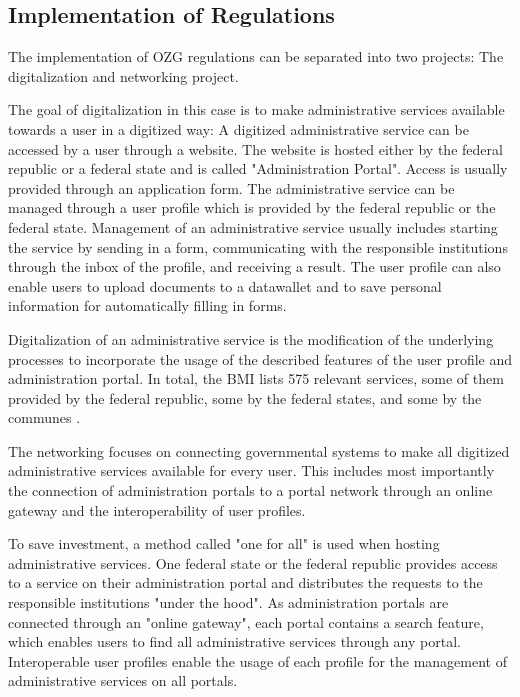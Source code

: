\subsection{Implementation of Regulations}

The implementation of OZG regulations can be separated into two projects: The digitalization and networking project.

The goal of digitalization in this case is to make administrative services available towards a user in a digitized way: A digitized administrative service can be accessed by a user through a website. The website is hosted either by the federal republic or a federal state and is called "Administration Portal". Access is usually provided through an application form. The administrative service can be managed through a user profile which is provided by the federal republic or the federal state. Management of an administrative service usually includes starting the service by sending in a form, communicating with the responsible institutions through the inbox of the profile, and receiving a result. The user profile can also enable users to upload documents to a datawallet and to save personal information for automatically filling in forms.

Digitalization of an administrative service is the modification of the underlying processes to incorporate the usage of the described features of the user profile and administration portal. In total, the BMI lists 575 relevant services, some of them provided by the federal republic, some by the federal states, and some by the communes \cite{BMI:Onlinezugangsgesetz}.

The networking focuses on connecting governmental systems to make all digitized administrative services available for every user. This includes most importantly the connection of administration portals to a portal network through an online gateway and the interoperability of user profiles.

To save investment, a method called "one for all" is used when hosting administrative services. One federal state or the federal republic provides access to a service on their administration portal and distributes the requests to the responsible institutions "under the hood". As administration portals are connected through an "online gateway", each portal contains a search feature, which enables users to find all administrative services through any portal. Interoperable user profiles enable the usage of each profile for the management of administrative services on all portals.

